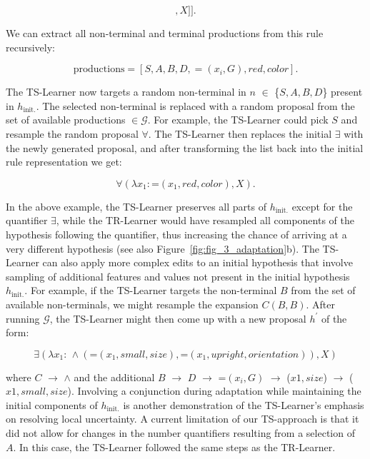 \documentclass[doc,natbib,floatsintext]{apa7}
\newcommand{\hi}{h_{\mathrm{init.}}}
\begin{document}
\begin{appendices}
\begin{equation}
    [\exists,[\lambda x_{1}:,=,[x_{1},red,color],X]].
\label{equ:equ_a4_1_ts_1}
\end{equation}

We can extract all non-terminal and terminal productions from this rule recursively: 

\begin{equation}
    \mathrm{productions} = [S,A,B,D,=\!(x_i, G),red,color].
\label{equ:equ_a4_2_ts_2}
\end{equation}

The TS-Learner now targets a random non-terminal in \(n\) \(\in\) \{$S,A,B,D$\} present in $\hi$. The selected non-terminal is replaced with a random proposal from the set of available productions \(\in \mathcal{G}\). For example, the TS-Learner could pick \(S\) and resample the random proposal \(\forall\). The TS-Learner then replaces the initial \(\exists\) with the newly generated proposal, and after transforming the list back into the initial rule representation we get: 

\begin{equation}
    \forall(\lambda x_{1} : \text{=}(x_{1}, red,color),X).
\label{equ:equ_a4_3_ts_3}
\end{equation}

In the above example, the TS-Learner preserves all parts of \(\hi\) except for the quantifier \(\exists\), while the TR-Learner would have resampled all components of the hypothesis following the quantifier, thus increasing the chance of arriving at a very different hypothesis (see also Figure~\ref{fig:fig_3_adaptation}b). The TS-Learner can also apply more complex edits to an initial hypothesis that involve sampling of additional features and values not present in the initial hypothesis \(\hi\). For example, if the TS-Learner targets the non-terminal \(B\) from the set of available non-terminals, we might resample the expansion \(C(B,B)\). After running \(\mathcal{G}\), the TS-Learner might then come up with a new proposal \(h^{'}\) of the form:

\begin{equation}
     \exists(\lambda x_{1}\text{: }  \wedge(\text{=}(x_{1},small,size),\text{=}(x_{1},upright,orientation)), X)
\label{equ:equ_a4_4_ts_4}
\end{equation} 

where \(C\) \(\rightarrow\) \(\wedge\) and the additional \(B\) \(\rightarrow\) \(D\) \(\rightarrow\) \(\text{=}(x_i, G)\) \(\rightarrow\) (\(x1,size\)) \(\rightarrow\) (\(x1,small, size\)). Involving a conjunction during adaptation while maintaining the initial components of $\hi$ is another demonstration of the TS-Learner's emphasis on resolving local uncertainty. A current limitation of our TS-approach is that it did not allow for changes in the number quantifiers resulting from a selection of $A$. In this case, the  TS-Learner followed the same steps as the TR-Learner. 


\end{appendices}
\end{document}
